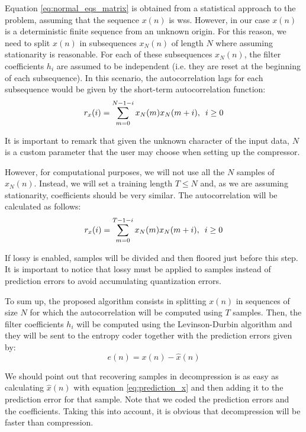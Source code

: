 Equation \ref{eq:normal_eqs_matrix} is obtained from a statistical approach to the problem, assuming that the sequence $x(n)$ is \acrshort{wss}. However, in our case $x(n)$ is a deterministic finite sequence from an unknown origin. For this reason, we need to split $x(n)$ in subsequences $x_N(n)$ of length $N$ where assuming stationarity is reasonable. For each of these subsequences $x_N(n)$, the filter coefficients $h_i$ are assumed to be independent (i.e. they are reset at the beginning of each subsequence). In this scenario, the autocorrelation lags for each subsequence would be given by the short-term autocorrelation function:
\begin{equation}
r_x(i) = \sum_{m=0}^{N-1-i} x_N(m) x_N(m+i) ,\hspace{0.5em} i \geq 0
\end{equation}

It is important to remark that given the unknown character of the input data, $N$ is a custom parameter that the user may choose when setting up the compressor.

However, for computational purposes, we will not use all the $N$ samples of $x_N(n)$. Instead, we will set a training length $T \leq N$ and, as we are assuming stationarity, coefficients should be very similar. The autocorrelation will be calculated as follows:
\begin{equation}
	r_x(i) = \sum_{m=0}^{T-1-i} x_N(m) x_N(m+i) ,\hspace{0.5em} i \geq 0
\end{equation}

If lossy is enabled, samples will be divided and then floored just before this step. It is important to notice that lossy must be applied to samples instead of prediction errors to avoid accumulating quantization errors.

To sum up, the proposed algorithm consists in splitting $x(n)$ in sequences of size $N$ for which the autocorrelation will be computed using $T$ samples. Then, the filter coefficients $h_i$ will be computed using the Levinson-Durbin algorithm and they will be sent to the entropy coder together with the prediction errors given by:
\begin{equation}
e(n) = x(n) - \hat{x}(n)
\end{equation}

We should point out that recovering samples in decompression is as easy as calculating $\hat{x}(n)$ with equation \ref{eq:prediction_x} and then adding it to the prediction error for that sample. Note that we coded the prediction errors and the coefficients. Taking this into account, it is obvious that decompression will be faster than compression.

